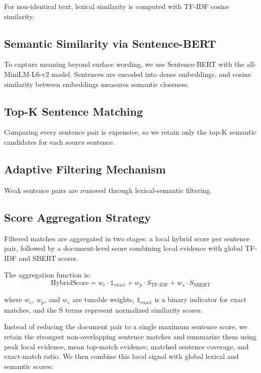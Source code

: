 \documentclass{llncs}
\begin{document}
For non-identical text, lexical similarity is computed with TF-IDF cosine similarity.

\subsection{Semantic Similarity via Sentence-BERT}

To capture meaning beyond surface wording, we use Sentence-BERT with the all-MiniLM-L6-v2 model. Sentences are encoded into dense embeddings, and cosine similarity between embeddings measures semantic closeness.

\subsection{Top-K Sentence Matching}

Comparing every sentence pair is expensive, so we retain only the top-K semantic candidates for each source sentence.

\subsection{Adaptive Filtering Mechanism}

Weak sentence pairs are removed through lexical-semantic filtering.

\subsection{Score Aggregation Strategy}

Filtered matches are aggregated in two stages: a local hybrid score per sentence pair, followed by a document-level score combining local evidence with global TF-IDF and SBERT scores.

The aggregation function is:
$$\text{HybridScore} = w_e \cdot \mathbb{1}_{\text{exact}} + w_p \cdot S_{\text{TF-IDF}} + w_s \cdot S_{\text{SBERT}}$$

where $w_e$, $w_p$, and $w_s$ are tunable weights, $\mathbb{1}_{\text{exact}}$ is a binary indicator for exact matches, and the S terms represent normalized similarity scores.

Instead of reducing the document pair to a single maximum sentence score, we retain the strongest non-overlapping sentence matches and summarize them using peak local evidence, mean top-match evidence, matched sentence coverage, and exact-match ratio. We then combine this local signal with global lexical and semantic scores:
\end{document}
